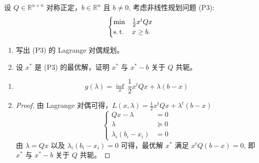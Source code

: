 \begin{Problem}
    设 $Q \in \mathbb{R}^{n \times n}$ 对称正定，$b \in \mathbb{R}^n$ 且 $b\neq 0$, 考虑非线性规划问题 (P3):
    \[
        \begin{cases}
            \min &\frac{1}{2}x^tQx\\
            \operatorname{s.t.} &x \ge b.
        \end{cases}
    \]
    \begin{enumerate}[label={(\arabic*)}]
        \item 写出 (P3) 的 Lagrange 对偶规划。
        \item 设 $x^*$ 是 (P3) 的最优解，证明 $x^*$ 与 $x^* - b$ 关于 $Q$ 共轭。
    \end{enumerate}

    \Answer
    \leavevmode
    \begin{enumerate}[label=(\arabic*)]
        \item 
        \[
            g(\lambda) = \inf_x \ \frac{1}{2}x^tQx + \lambda(b - x)
        \]
        \item 
        \begin{proof}
            由 Lagrange 对偶可得，$L(x, \lambda) = \frac{1}{2}x^tQx + \lambda^t(b - x)$
            \[
                \begin{cases}
                    Qx - \lambda &= 0\\
                    \lambda &\succeq 0\\
                    \lambda_i(b_i - x_i) &= 0
                \end{cases}
            \]
            由 $\lambda = Qx$ 以及 $\lambda_i(b_i - x_i) = 0$ 可得，最优解 $x^*$ 满足 $x^tQ(b - x) = 0$, 即 $x^*$ 与 $x^* - b$ 关于 $Q$ 共轭。
        \end{proof}
    \end{enumerate}
\end{Problem}

